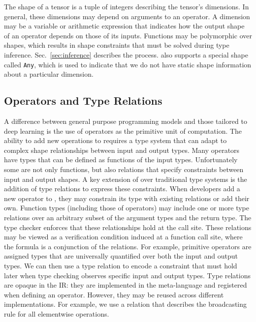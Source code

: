  The shape of a tensor is a tuple of integers describing the tensor's dimensions.
  In general, these dimensions may depend on arguments to an operator.
  A dimension may be a variable or arithmetic expression that indicates how the
    output shape of an operator depends on those of its inputs.
  Functions may be polymorphic over shapes, which results
    in shape constraints that must be solved during type inference.
  Sec.~\ref{sec:inference} describes the process.
  \relay also supports a special shape called \verb|Any|, which is used
    to indicate that we do not have static shape information about a particular dimension.

  \subsection{Operators and Type Relations}

  A difference between general purpose programming models and those tailored to deep learning
    is the use of operators as the primitive unit of computation.
  The ability to add new operations to \relay requires a type system that can adapt to
    complex shape relationships between input and output types.
  Many operators have types that can be defined
    as functions of the input types.
  Unfortunately some are not only functions,
    but also relations that specify constraints between input and output shapes.
  A key extension of \relay over traditional type systems is the addition of type relations
    to express these constraints.
  When developers add a new operator to \relay, they may constrain its
    type with existing relations or add their own.
  Function types (including those of operators) may include
    one or more type relations over an arbitrary subset of the argument types and the return type.
  The type checker enforces that these relationships hold at the call site.
  These relations may be viewed as a verification condition induced at a
    function call site, where the formula is a conjunction of the relations.
  For example, primitive operators are assigned types that are universally quantified over
    both the input and output types.
  We can then use a type relation to encode a constraint that must hold later
    when type checking observes specific input and output types.
  Type relations are opaque in the \relay IR: they are implemented in the
    meta-language and registered when defining an operator.
  However, they may be reused across different implementations.
  For example, we use a relation that describes the
    broadcasting rule for all elementwise operations.

